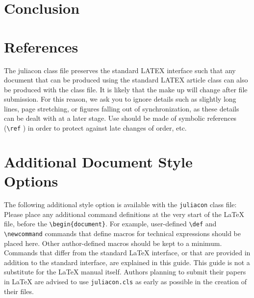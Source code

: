 \documentclass{juliacon}
\begin{document}
\section{Conclusion}


\section{References}
%
The juliacon class file preserves the standard LATEX{} interface such
that any document that can be produced using the standard LATEX{}
article class can also be produced with the class file.\vskip 6pt
It is likely that the make up will change after file submission. For
this reason, we ask you to ignore details such as slightly long lines,
page stretching, or figures falling out of synchronization, as these
details can be dealt with at a later stage.\vskip 6pt
Use should be made of symbolic references (\verb|\ref| ) in order to
protect against late changes of order, etc.



\section{Additional Document Style Options}
\label{sec:additional_doc}
%
The following additional style option is available with the \verb|juliacon|  class file:
\vskip 6pt
Please place any additional command definitions at the very start of
the \LaTeX{} file, before the \verb|\begin{document}|. For example, user-defined
\verb|\def|  and \verb|\newcommand|   commands that define macros for
technical expressions should be placed here. Other author-defined
macros should be kept to a minimum.
\vskip 6pt
Commands that differ from the standard \LaTeX{} interface, or that
are provided in addition to the standard interface, are explained in
this guide. This guide is not a substitute for the \LaTeX{} manual itself.
Authors planning to submit their papers in \LaTeX{} are advised to use
\verb|juliacon.cls|  as early as possible in the creation of their files.
\end{document}
